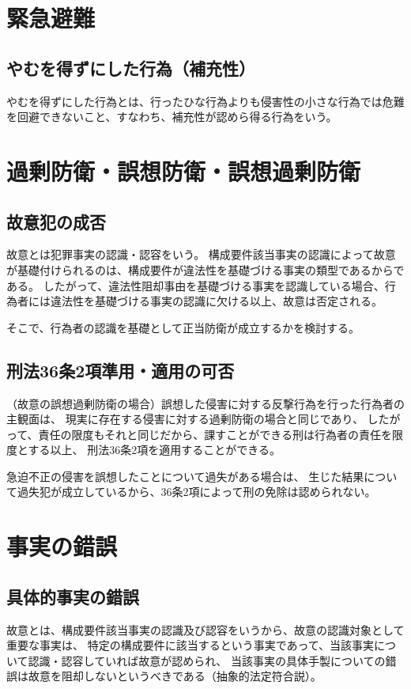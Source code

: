\documentclass[11pt]{jsarticle}
\begin{document}
	\section{緊急避難}
		\subsection{やむを得ずにした行為（補充性）}
			やむを得ずにした行為とは、行ったひな行為よりも侵害性の小さな行為では危難を回避できないこと、すなわち、補充性が認めら得る行為をいう。
		
	
		
	\section{過剰防衛・誤想防衛・誤想過剰防衛}
		\subsection{故意犯の成否}
			故意とは犯罪事実の認識・認容をいう。
			構成要件該当事実の認識によって故意が基礎付けられるのは、構成要件が違法性を基礎づける事実の類型であるからである。
			したがって、違法性阻却事由を基礎づける事実を認識している場合、行為者には違法性を基礎づける事実の認識に欠ける以上、故意は否定される。
			
			そこで、行為者の認識を基礎として正当防衛が成立するかを検討する。
			
		\subsection{刑法36条2項準用・適用の可否}
			（故意の誤想過剰防衛の場合）誤想した侵害に対する反撃行為を行った行為者の主観面は、
			現実に存在する侵害に対する過剰防衛の場合と同じであり、
			したがって、責任の限度もそれと同じだから、課すことができる刑は行為者の責任を限度とする以上、
			刑法36条2項を適用することができる。
			
			急迫不正の侵害を誤想したことについて過失がある場合は、
			生じた結果について過失犯が成立しているから、36条2項によって刑の免除は認められない。
			
	\section{事実の錯誤}
		\subsection{具体的事実の錯誤}
			故意とは、構成要件該当事実の認識及び認容をいうから、故意の認識対象として重要な事実は、
			特定の構成要件に該当するという事実であって、当該事実について認識・認容していれば故意が認められ、
			当該事実の具体手製についての錯誤は故意を阻却しないというべきである（抽象的法定符合説）。
		
\end{document}
